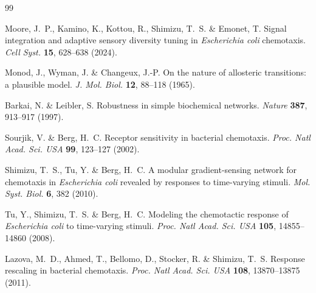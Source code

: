 ﻿\documentclass[11pt,a4paper]{article}
\begin{document}
\begin{thebibliography}{99}
\small

Moore, J.~P., Kamino, K., Kottou, R., Shimizu, T.~S. \& Emonet, T. Signal integration and adaptive
sensory diversity tuning in \emph{Escherichia coli} chemotaxis. \emph{Cell Syst.} \textbf{15},
628--638 (2024).

Monod, J., Wyman, J. \& Changeux, J.-P. On the nature of allosteric transitions: a plausible model.
\emph{J. Mol. Biol.} \textbf{12}, 88--118 (1965).

Barkai, N. \& Leibler, S. Robustness in simple biochemical networks. \emph{Nature} \textbf{387},
913--917 (1997).

Sourjik, V. \& Berg, H.~C. Receptor sensitivity in bacterial chemotaxis. \emph{Proc. Natl Acad.
Sci. USA} \textbf{99}, 123--127 (2002).

Shimizu, T.~S., Tu, Y. \& Berg, H.~C. A modular gradient-sensing network for chemotaxis in
\emph{Escherichia coli} revealed by responses to time-varying stimuli. \emph{Mol. Syst. Biol.}
\textbf{6}, 382 (2010).

Tu, Y., Shimizu, T.~S. \& Berg, H.~C. Modeling the chemotactic response of \emph{Escherichia coli}
to time-varying stimuli. \emph{Proc. Natl Acad. Sci. USA} \textbf{105}, 14855--14860 (2008).

Lazova, M.~D., Ahmed, T., Bellomo, D., Stocker, R. \& Shimizu, T.~S. Response rescaling in
bacterial chemotaxis. \emph{Proc. Natl Acad. Sci. USA} \textbf{108}, 13870--13875 (2011).

\end{thebibliography}
\end{document}
